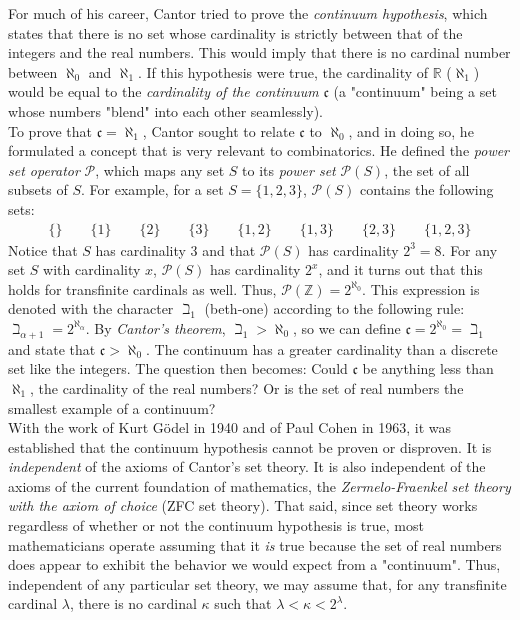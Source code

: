 For much of his career, Cantor tried to prove the \textit{continuum hypothesis}, which states that there is no set whose cardinality is strictly between that of the integers and the real numbers. This would imply that there is no cardinal number between $\aleph_0$ and $\aleph_1$. If this hypothesis were true, the cardinality of $\mathbb{R}$ ($\aleph_1$) would be equal to the \textit{cardinality of the continuum} $\mathfrak{c}$ (a "continuum" being a set whose numbers "blend" into each other seamlessly). \\

To prove that $\mathfrak{c}=\aleph_1$, Cantor sought to relate $\mathfrak{c}$ to $\aleph_0$, and in doing so, he formulated a concept that is very relevant to combinatorics. He defined the \textit{power set operator} $\mathcal{P}$, which maps any set $S$ to its \textit{power set} $\mathcal{P}(S)$, the set of all subsets of $S$. For example, for a set $S=\{1,2,3\}$, $\mathcal{P}(S)$ contains the following sets:
\begin{align*}
\{\}\qquad\{1\}\qquad\{2\}\qquad\{3\}\qquad\{1,2\}\qquad\{1,3\}\qquad\{2,3\}\qquad\{1,2,3\}
\end{align*}
Notice that $S$ has cardinality $3$ and that $\mathcal{P}(S)$ has cardinality $2^3=8$. For any set $S$ with cardinality $x$, $\mathcal{P}(S)$ has cardinality $2^x$, and it turns out that this holds for transfinite cardinals as well. Thus, $\mathcal{P}(\mathbb{Z})=2^{\aleph_0}$. This expression is denoted with the character $\beth_1$ (beth-one) according to the following rule: $\beth_{\alpha+1}=2^{\aleph_\alpha}$. By \textit{Cantor's theorem}, $\beth_1 > \aleph_0$, so we can define $\mathfrak{c}=2^{\aleph_0}=\beth_1$ and state that $\mathfrak{c} > \aleph_0$. The continuum has a greater cardinality than a discrete set like the integers. The question then becomes: Could $\mathfrak{c}$ be anything less than $\aleph_1$, the cardinality of the real numbers? Or is the set of real numbers the smallest example of a continuum? \\

With the work of Kurt G\"odel in 1940 and of Paul Cohen in 1963, it was established that the continuum hypothesis cannot be proven or disproven. It is \textit{independent} of the axioms of Cantor's set theory. It is also independent of the axioms of the current foundation of mathematics, the \textit{Zermelo-Fraenkel set theory with the axiom of choice} (ZFC set theory). That said, since set theory works regardless of whether or not the continuum hypothesis is true, most mathematicians operate assuming that it \textit{is} true because the set of real numbers does appear to exhibit the behavior we would expect from a "continuum". Thus, independent of any particular set theory, we may assume that, for any transfinite cardinal $\lambda$, there is no cardinal $\kappa$ such that $\lambda<\kappa<2^\lambda$. \\\\

